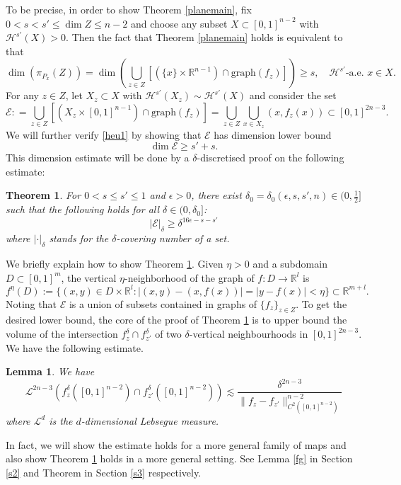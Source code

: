 \documentclass[11pt,a4paper,reqno]{amsart}
\newcommand{\R}{\mathbb{R}}
\newcommand{\calL}{\mathcal{L}}
\newcommand{\calH}{\mathcal{H}}
\newcommand{\calE}{\mathcal{E}}
\newcommand{\1}{\mathbf{1}}
\def\dz{\delta}
\numberwithin{equation}{section}
\theoremstyle{plain}
\newtheorem{thm}[equation]{Theorem}
\newtheorem{lemma}[equation]{Lemma}
\theoremstyle{definition}
\theoremstyle{remark}
\begin{document}
To be precise,
in order to show Theorem \ref{planemain}, fix $0<s<s' \le \dim Z \le n-2$ and choose any subset $X \subset [0,1]^{n-2}$ with $\calH^{s'}(X)>0$.
Then the fact that Theorem \ref{planemain} holds is equivalent to that
\begin{equation}\label{heu1}
  \dim (\pi_{P_x}(Z)) = \dim (\bigcup_{z \in Z} [(\{x\} \times \R^{n-1}) \cap \mbox{graph}(f_z)]) \ge s, \quad \mathcal{H}^{s'}\mbox{-a.e. } x \in X.
\end{equation}
For any $z \in Z$, let $X_z \subset X$ with $\calH^{s'}(X_z) \sim \calH^{s'}(X)$ and consider the set
\begin{equation}\label{heu3}
    \calE:  = \bigcup_{z \in Z} [(X_z \times [0,1]^{n-1}) \cap \mbox{graph}(f_z)]= \bigcup_{z \in Z} \bigcup_{x \in X_z}(x,f_z(x)) \subset [0,1]^{2n-3}.
\end{equation}
We will further verify \eqref{heu1} by showing that $\calE$ has dimension lower bound
\begin{equation}\label{heu2}
  \dim \calE \ge s' +s.
\end{equation}
This dimension estimate will be done by a $\dz$-discretised proof on the following estimate:
\begin{thm}\label{thmconfig}
For $0<s \le s' \le 1$ and $\epsilon>0$, there exist $\delta_{0}=\delta_{0}(\epsilon,s,s',n) \in (0,\tfrac{1}{2}]$ such that the following holds for all $\delta \in (0,\delta_{0}]$:
$$|\mathcal{E}|_{\delta} \geq \delta^{16\epsilon - s- s'}$$
where $|\cdot|_\delta$ stands for the $\delta$-covering number of a set.
\end{thm}


We briefly explain how to show Theorem \ref{thmconfig}. Given $\eta>0$ and a subdomain $D \subset [0,1]^{m}$, the vertical $\eta$-neighborhood of the graph of $f:D \to \R^l$ is
\begin{equation}\label{vertical}
  f^{\eta}(D):= \{(x,y) \in D \times \R^{l} : |(x,y)-(x,f(x))|= |y-f(x)|< \eta \} \subset \R^{m+l} .
\end{equation}
Noting that $\calE$ is a union of subsets contained in graphs of $\{f_z\}_{z \in Z}$. To get the desired lower bound,
the core of the proof of Theorem \ref{thmconfig} is to upper bound the volume of the intersection $f^\delta_z \cap f^\delta_{z'}$ of two $\delta$-vertical neighbourhoods in $[0,1]^{2n-3}$.
We have the following estimate.

\begin{lemma} \label{pairvolume2}
We have
  $$ \calL^{2n-3} (f^\delta_z([0,1]^{n-2}) \cap f^\delta_{z'}([0,1]^{n-2})) \lesssim \frac{\delta^{2n-3}}{\|f_z-f_{z'}\|_{C^2([0,1]^{n-2})}^{n-2}} $$
  where $\calL^{d}$ is the $d$-dimensional Lebsegue measure.
\end{lemma}
In fact, we will show the estimate holds for a more general family of maps and also show Theorem \ref{thmconfig} holds in a more general setting. See Lemma \ref{fg} in Section \ref{s2} and Theorem in Section \ref{s3} respectively.
\end{document}

